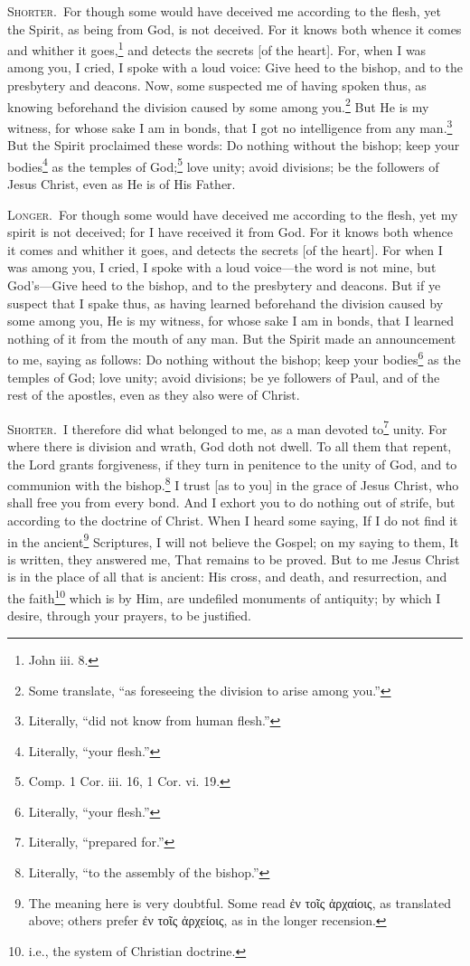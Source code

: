 
\textsc{Shorter.}~For though some would have deceived me according to the flesh, yet the Spirit, as being from God, is not deceived. For it knows both whence it comes and whither it goes,\footnote{John iii. 8.} and detects the secrets [of the heart]. For, when I was among you, I cried, I spoke with a loud voice: Give heed to the bishop, and to the presbytery and deacons. Now, some suspected me of having spoken thus, as knowing beforehand the division caused by some among you.\footnote{Some translate, “as foreseeing the division to arise among you.”} But He is my witness, for whose sake I am in bonds, that I got no intelligence from any man.\footnote{Literally, “did not know from human flesh.”} But the Spirit proclaimed  these words: Do nothing without the bishop; keep your bodies\footnote{Literally, “your flesh.”} as the temples of God;\footnote{Comp. 1 Cor. iii. 16, 1 Cor. vi. 19.} love unity; avoid divisions; be the followers of Jesus Christ, even as He is of His Father.

\textsc{Longer.}~For though some would have deceived me according to the flesh, yet my spirit is not deceived; for I have received it from God. For it knows both whence it comes and whither it goes, and detects the secrets [of the heart]. For when I was among you, I cried, I spoke with a loud voice—the word is not mine, but God’s—Give heed to the bishop, and to the presbytery and deacons. But if ye suspect that I spake thus, as having learned beforehand the division caused by some among you, He is my witness, for whose sake I am in bonds, that I learned nothing of it from the mouth of any man. But the Spirit made an announcement to me, saying as follows: Do nothing without the bishop; keep your bodies\footnote{Literally, “your flesh.”} as the temples of God; love unity; avoid divisions; be ye followers of Paul, and of the rest of the apostles, even as they also were of Christ.


\textsc{Shorter.}~I therefore did what belonged to me, as a man devoted to\footnote{Literally, “prepared for.”} unity. For where there is division and wrath, God doth not dwell. To all them that repent, the Lord grants forgiveness, if they turn in penitence to the unity of God, and to communion with the bishop.\footnote{Literally, “to the assembly of the bishop.”} I trust [as to you] in the grace of Jesus Christ, who shall free you from every bond. And I exhort you to do nothing out of strife, but according to the doctrine of Christ. When I heard some saying, If I do not find it in the ancient\footnote{The meaning here is very doubtful. Some read \textgreek{ἐν τοῖς ἀρχαίοις}, as translated above; others prefer \textgreek{ἐν τοῖς ἀρχείοις}, as in the longer recension.} Scriptures, I will not believe the Gospel; on my saying to them, It is written, they answered me, That remains to be proved. But to me Jesus Christ is in the place of all that is ancient: His cross, and death, and resurrection, and the faith\footnote{i.e., the system of Christian doctrine.} which is by Him, are undefiled monuments of antiquity; by which I desire, through your prayers, to be justified.

